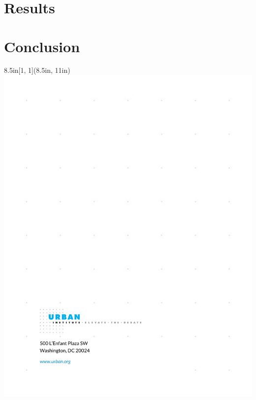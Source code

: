 \documentclass[
]{urban-formatting}
\begin{document}
\section{Results}

\section{Conclusion}











\newpage
\thispagestyle{empty}

\begin{textblock*}{8.5in}[1, 1](8.5in, 11in)
    \noindent\includegraphics[width=\paperwidth,height=\paperheight]{images/back.pdf}
\end{textblock*}
\end{document}
